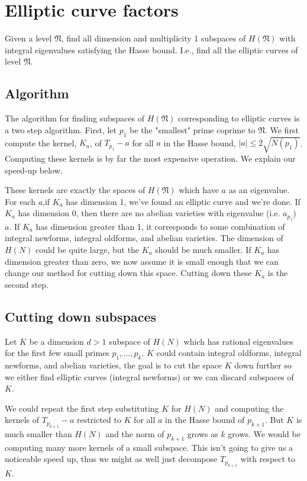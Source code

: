 \documentclass{article}
\theoremstyle{plain}
\begin{document}
\section{Elliptic curve factors} 
Given a level $\mathfrak{N}$, find all dimension and multiplicity 1 subspaces of $H(\mathfrak{N})$ with integral eigenvalues satisfying the Hasse bound.
I.e., find all the elliptic curves of level $\mathfrak{N}$.

\subsection{Algorithm}

The algorithm for finding subspaces of $H(\mathfrak{N})$ corresponding to elliptic curves is a two step algorithm. First, let $p_1$ be the "smallest" prime coprime to $\mathfrak{N}$. We first compute the kernel, $K_a$, of $T_{p_1} - a$ for all $a$ in the Hasse bound, $|a| \leq 2\sqrt{N(p_1)}$. Computing these kernels is by far the most expensive operation. We explain our speed-up below.

These kernels are exactly the spaces of $H(\mathfrak{N})$ which have $a$ as an eigenvalue. For each $a$,if $K_a$ has dimension 1, we've found an elliptic curve and we're done. If $K_a$ has dimension 0, then there are no abelian varieties with eigenvalue (i.e. $a_{p_1}$) $a$. If $K_a$ has dimension greater than 1, it corresponds to some combination of integral newforms, integral oldforms, and abelian varieties. The dimension of $H(N)$ could be quite large, but the $K_a$ should be much smaller. If $K_a$ has dimension greater than zero, we now assume it is small enough that we can change our method for cutting down this space. Cutting down these $K_a$ is the second step.

\subsection{Cutting down subspaces}
Let $K$ be a dimension $d > 1$ subspace of $H(N)$ which has rational eigenvalues for the first few small primes $p_1,...,p_k$. $K$ could contain integral oldforms, integral newforms, and abelian varieties, the goal is to cut the space $K$ down further so we either find elliptic curves (integral newforms) or we can discard subspaces of $K$.

We could repeat the first step substituting $K$ for $H(N)$ and computing the kernels of $T_{p_{k+1}} - a$ restricted to $K$ for all $a$ in the Hasse bound of $p_{k+1}$. But $K$ is much smaller than $H(N)$ and the norm of $p_{k+1}$ grows as $k$ grows. We would be computing many more kernels of a small subspace. This isn't going to give us a noticeable speed up, thus we might as well just decompose $T_{p_{k+1}}$ with respect to $K$.
\end{document}
